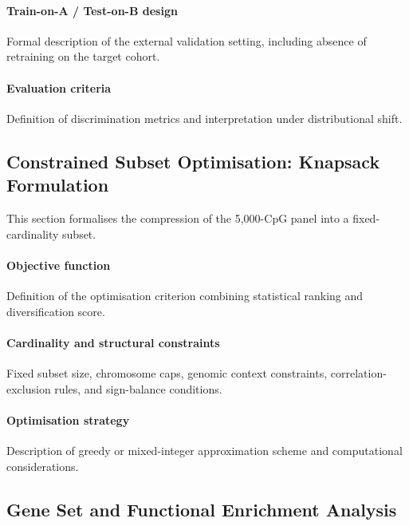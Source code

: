\paragraph{Train-on-A / Test-on-B design}
Formal description of the external validation setting,
including absence of retraining on the target cohort.

\paragraph{Evaluation criteria}
Definition of discrimination metrics and interpretation
under distributional shift.

\subsection{Constrained Subset Optimisation: Knapsack Formulation}

This section formalises the compression of the 5,000-CpG panel
into a fixed-cardinality subset.

\paragraph{Objective function}
Definition of the optimisation criterion combining
statistical ranking and diversification score.

\paragraph{Cardinality and structural constraints}
Fixed subset size, chromosome caps,
genomic context constraints,
correlation-exclusion rules,
and sign-balance conditions.

\paragraph{Optimisation strategy}
Description of greedy or mixed-integer approximation scheme
and computational considerations.

\subsection{Gene Set and Functional Enrichment Analysis}

